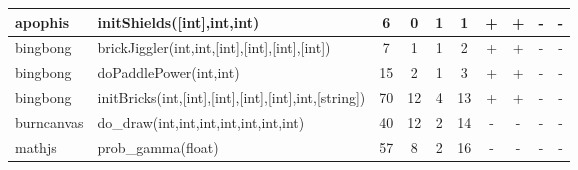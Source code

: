 \begin{table}[!t]
\begin{tabular}{l|l|c|c|c|c|c|c|c|c}
    \hline
    apophis    & initShields([int],int,int)                                              & 6  & 0 & 1 & 1 & + & + & - & -\\
    \hline
    bingbong   & brickJiggler(int,int,[int],[int],[int],[int]) & 7  & 1  & 1 & 2  & + & + & - & - \\
    bingbong   & doPaddlePower(int,int)                            & 15 & 2  & 1 & 3  & + & + & - & - \\
    bingbong   & initBricks(int,[int],[int],[int],[int],int,[string])                         & 70 & 12 & 4 & 13 & + & + & - & - \\
    \hline
    burncanvas & do\_draw(int,int,int,int,int,int,int)                 & 40 & 12 & 2 & 14 & - & - & - & - \\
    \hline
    mathjs     & prob\_gamma(float)                                   & 57 & 8  & 2 & 16 & - & - & - & - \\
    \bottomrule
  \end{tabular}
\end{table}
